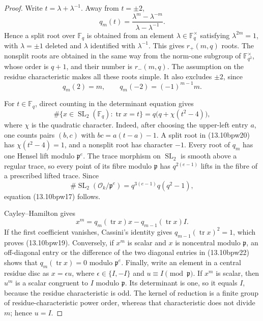 \documentclass[11pt,reqno]{amsart}
\theoremstyle{definition}
\theoremstyle{remark}
\newcommand{\F}{\mathbb F}
\newcommand{\cO}{\mathcal O}
\newcommand{\Tr}{\operatorname{tr}}
\newcommand{\SL}{\operatorname{SL}}
\begin{document}
\begin{proof}
Write \(t=\lambda+\lambda^{-1}\).  Away from \(t=\pm2\),
\[
 q_m(t)=\frac{\lambda^m-\lambda^{-m}}
              {\lambda-\lambda^{-1}}.
\tag{13.10bpw20}
\]
Hence a split root over \(\F_q\) is obtained from an element
\(\lambda\in\F_q^\times\) satisfying \(\lambda^{2m}=1\), with
\(\lambda=\pm1\) deleted and \(\lambda\) identified with
\(\lambda^{-1}\).  This gives \(r_+(m,q)\) roots.  The nonsplit roots are
obtained in the same way from the norm-one subgroup of
\(\F_{q^2}^\times\), whose order is \(q+1\), and their number is
\(r_-(m,q)\).  The assumption on the residue characteristic makes all
these roots simple.  It also excludes \(\pm2\), since
\[
 q_m(2)=m,\qquad q_m(-2)=(-1)^{m-1}m.
\]

For \(t\in\F_q\), direct counting in the determinant equation gives
\[
 \#\{x\in\SL_2(\F_q):\Tr x=t\}
 =q\bigl(q+\chi(t^2-4)\bigr),
\tag{13.10bpw21}
\]
where \(\chi\) is the quadratic character.  Indeed, after choosing the
upper-left entry \(a\), one counts pairs \((b,c)\) with
\(bc=a(t-a)-1\).  A split root in (13.10bpw20) has
\(\chi(t^2-4)=1\), and a nonsplit root has character \(-1\).
Every root of \(q_m\) has one Hensel lift modulo \(\mathfrak p^e\).
The trace morphism on \(\SL_2\) is smooth above a regular trace, so every
point of its fibre modulo \(\mathfrak p\) has \(q^{2(e-1)}\) lifts in the
fibre of a prescribed lifted trace.  Since
\[
 \#\SL_2(\cO_k/\mathfrak p^e)
 =q^{3(e-1)}q(q^2-1),
\]
equation (13.10bpw17) follows.

Cayley--Hamilton gives
\[
 x^m=q_m(\Tr x)x-q_{m-1}(\Tr x)I.
\tag{13.10bpw22}
\]
If the first coefficient vanishes, Cassini's identity gives
\(q_{m-1}(\Tr x)^2=1\), which proves (13.10bpw19).  Conversely, if
\(x^m\) is scalar and \(x\) is noncentral modulo \(\mathfrak p\), an
off-diagonal entry or the difference of the two diagonal entries in
(13.10bpw22) shows that \(q_m(\Tr x)=0\) modulo \(\mathfrak p^e\).
Finally, write an element in a central residue disc as \(x=\epsilon u\),
where \(\epsilon\in\{I,-I\}\) and \(u\equiv I\pmod{\mathfrak p}\).
If \(x^m\) is scalar, then \(u^m\) is a scalar congruent to \(I\) modulo
\(\mathfrak p\).  Its determinant is one, so it equals \(I\), because the
residue characteristic is odd.  The kernel of reduction is a finite group
of residue-characteristic power order, whereas that characteristic does
not divide \(m\); hence \(u=I\).
\end{proof}
\end{document}
